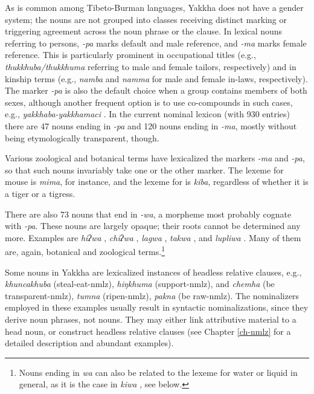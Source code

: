As is common among Tibeto-Burman languages, Yakkha does not have a gender system; the nouns are not grouped into classes receiving distinct marking or triggering agreement across the noun phrase or the clause. In lexical nouns referring to persons, \emph{-pa} marks default and male reference, and \emph{-ma} marks female reference. This is particularly prominent in occupational titles (e.g., \emph{thukkhuba/thukkhuma} referring to male and female tailors, respectively) and in kinship terms (e.g., \emph{namba} and \emph{namma} for male and female in-laws, respectively). The marker \emph{-pa} is also the default choice when a group contains members of both sexes, although another frequent option is to use co-compounds in such cases, e.g., \emph{yakkhaba-yakkhamaci} . In the current nominal lexicon (with 930 entries)  there are 47 nouns ending in \emph{-pa} and 120 nouns ending in \emph{-ma},  mostly without being  etymologically transparent, though.

Various zoological and botanical terms have lexicalized the markers \emph{-ma} and \emph{-pa}, so that such nouns invariably take one or the other marker. The lexeme  for mouse is \emph{mima},  for instance,  and the lexeme for  is  \emph{kiba}, regardless of whether it is a  tiger or a tigress.

There are also 73 nouns that end in \emph{-wa}, a morpheme most probably cognate with \emph{-pa}. These nouns are largely opaque; their roots cannot be determined any more. Examples are \emph{hiʔwa} , \emph{chiʔwa} , \emph{lagwa} , \emph{takwa} , and \emph{lupliwa} . Many of them are, again,  botanical and zoological terms.\footnote{Nouns ending in \emph{wa} can also be related to the lexeme for water or liquid in general, as it is the case in \emph{kiwa} , see below.}

Some nouns in Yakkha are lexicalized instances of headless relative clauses, e.g.,  \emph{khuncakhuba}  (steal-eat-{\sc nmlz}), \emph{hiŋkhuma}  (support-{\sc nmlz}), and \emph{chemha}  (be transparent-{\sc nmlz}),  \emph{tumna}  (ripen-{\sc nmlz}), \emph{pakna}  (be raw-{\sc nmlz}). The nominalizers employed in these examples usually result in syntactic nominalizations, since they derive noun phrases, not nouns. They may either link attributive material to a head noun, or  construct headless relative clauses  (see  Chapter \ref{ch-nmlz} for a detailed description and abundant examples). 


